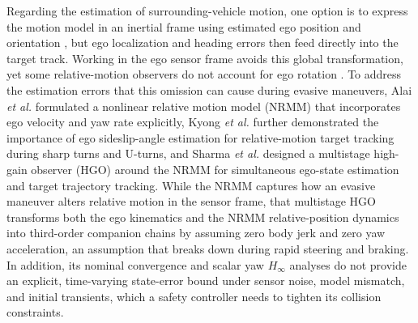 \documentclass[journal]{IEEEtran}
\theoremstyle{definition}
\begin{document}
Regarding the estimation of surrounding-vehicle motion, one option is to
express the motion model in an inertial frame using estimated ego position and
orientation \cite{SharmaRajamani2024}, but ego localization and heading errors
then feed directly into the target track. Working in the ego sensor frame
avoids this global transformation, yet some relative-motion observers do not
account for ego rotation
\cite{JeonZemoucheRajamani2019,AlaiZemoucheRajamani2024}. To address the estimation errors that this omission can cause during
evasive maneuvers, Alai \emph{et al.}
\cite{AlaiSharmaAlexanderRajamani2024} formulated a nonlinear relative motion
model (NRMM) that incorporates ego velocity and yaw rate explicitly,
Kyong \emph{et al.} \cite{KyongAlaiTamehRajamani2026} further demonstrated
the importance of ego sideslip-angle estimation for relative-motion target
tracking during sharp turns and U-turns, and Sharma
\emph{et al.} \cite{SharmaAlaiRajamani2026} designed a multistage high-gain
observer (HGO) around the NRMM for simultaneous ego-state estimation and target
trajectory tracking. While the NRMM captures how an evasive maneuver alters
relative motion in the sensor frame, that multistage HGO transforms both the
ego kinematics and the NRMM relative-position dynamics into third-order
companion chains by assuming zero body jerk and zero yaw acceleration, an
assumption that breaks down during rapid steering and braking. In addition, its
nominal convergence and scalar yaw $H_\infty$ analyses do not provide an
explicit, time-varying state-error bound under sensor noise, model mismatch,
and initial transients, which a safety controller needs to tighten its
collision constraints.
\end{document}
